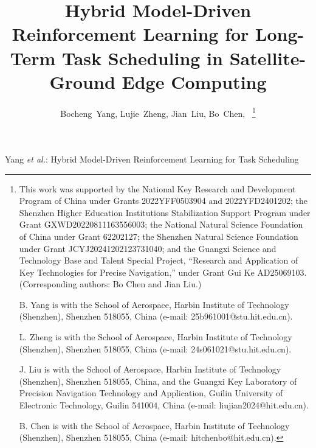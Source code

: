 \documentclass[lettersize,journal]{IEEEtran}
\begin{document}
\title{Hybrid Model-Driven Reinforcement Learning for Long-Term Task Scheduling in Satellite-Ground Edge Computing}
\author{
Bocheng~Yang,
Lujie~Zheng,
Jian~Liu,
Bo~Chen,~
\thanks{This work was supported by the National Key Research and Development Program of China under Grants 2022YFF0503904 and 2022YFD2401202; the Shenzhen Higher Education Institutions Stabilization Support Program under Grant GXWD20220811163556003; the National Natural Science Foundation of China under Grant 62202127; the Shenzhen Natural Science Foundation under Grant JCYJ20241202123731040; and the Guangxi Science and Technology Base and Talent Special Project, ``Research and Application of Key Technologies for Precise Navigation,'' under Grant Gui Ke AD25069103. (Corresponding authors: Bo Chen and Jian Liu.)

B. Yang is with the School of Aerospace, Harbin Institute of Technology (Shenzhen), Shenzhen 518055, China (e-mail: 25b961001@stu.hit.edu.cn).

L. Zheng is with the School of Aerospace, Harbin Institute of Technology (Shenzhen), Shenzhen 518055, China (e-mail: 24s061021@stu.hit.edu.cn).

J. Liu is with the School of Aerospace, Harbin Institute of Technology (Shenzhen), Shenzhen 518055, China, and the Guangxi Key Laboratory of Precision Navigation Technology and Application, Guilin University of Electronic Technology, Guilin 541004, China (e-mail: liujian2024@hit.edu.cn).

B. Chen is with the School of Aerospace, Harbin Institute of Technology (Shenzhen), Shenzhen 518055, China (e-mail: hitchenbo@hit.edu.cn).
}}

%
{Yang \MakeLowercase{\textit{et al.}}: Hybrid Model-Driven Reinforcement Learning for Task Scheduling}

\maketitle
\end{document}
